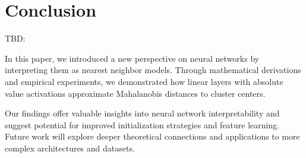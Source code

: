 
\section{Conclusion}
\label{sec:conclusion}
TBD:


In this paper, we introduced a new perspective on neural networks by interpreting them as nearest neighbor models. Through mathematical derivations and empirical experiments, we demonstrated how linear layers with absolute value activations approximate Mahalanobis distances to cluster centers.

Our findings offer valuable insights into neural network interpretability and suggest potential for improved initialization strategies and feature learning. Future work will explore deeper theoretical connections and applications to more complex architectures and datasets.

